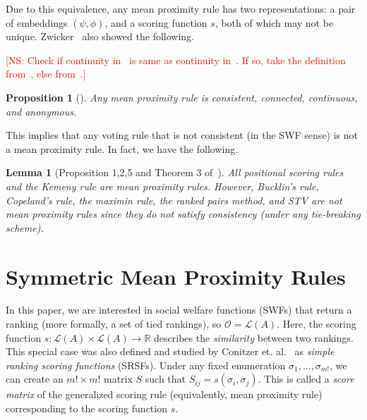 \documentclass[10pt,letterpaper]{article}
\newcommand{\calL}{{\mathcal{L}}}
\newcommand{\rank}{{\calL(A)}}
\newcommand{\calO}{{\mathcal{O}}}
\newtheorem{lemma}{Lemma}
\newtheorem{proposition}{Proposition}
\newcommand{\kibitz}[2]{\ifnum\Comments=1\textcolor{#1}{#2}\fi}
\newcommand{\cns}[1]{\kibitz{red} {[NS: #1]}}
\begin{document}

Due to this equivalence, any mean proximity rule has two representations: a pair of embeddings $(\psi,\phi)$, and a scoring function $s$, both of which may not be unique. Zwicker~\cite{Zwicker08b} also showed the following. %

\cns{Check if continuity in~\cite{CRX09} is same as continuity in~\cite{Zwicker08a}. If so, take the definition from~\cite{Zwicker08a}, else from~\cite{CRX09}.}
\begin{proposition}[\cite{Zwicker08b}]
Any mean proximity rule is consistent, connected, continuous, and anonymous.
\label{prop:properties}
\end{proposition}

This implies that any voting rule that is not consistent (in the SWF sense) is not a mean proximity rule. In fact, we have the following.

\begin{lemma}[Proposition 1,2,5 and Theorem 3 of~\cite{CRX09}]
All positional scoring rules and the Kemeny rule are mean proximity rules. However, Bucklin's rule, Copeland's rule, the maximin rule, the ranked pairs method, and STV are not mean proximity rules since they do not satisfy consistency (under any tie-breaking scheme). 
\end{lemma}


\section{Symmetric Mean Proximity Rules}

In this paper, we are interested in social welfare functions (SWFs) that return a ranking (more formally, a set of tied rankings), so $\calO = \rank$. %
Here, the scoring function $s : \rank \times \rank \rightarrow \mathbb{R}$ describes the \emph{similarity} between two rankings. This special case was also defined and studied by Conitzer et. al.~\cite{CRX09} as \emph{simple ranking scoring functions} (SRSFs). Under any fixed enumeration $\sigma_1,\ldots,\sigma_{m!}$, we can create an $m! \times m!$ matrix $S$ such that $S_{ij} = s(\sigma_i,\sigma_j)$. This is called a \emph{score matrix} of the generalized scoring rule (equivalently, mean proximity rule) corresponding to the scoring function $s$. 
\end{document}
